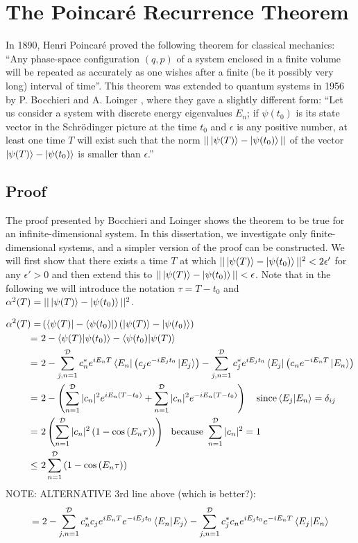 \documentclass[a4paper,10pt]{article}
\begin{document}
\section{The Poincar\'e Recurrence Theorem}

In 1890, Henri Poincar\'e proved the following theorem for classical mechanics: ``Any phase-space configuration $(q,p)$ of a system enclosed in a finite volume will be repeated as accurately as one wishes
after a finite (be it possibly very long) interval of time''. This theorem was extended to quantum systems in 1956 by P. Bocchieri and A. Loinger \cite{Bocchieri1957}, where they gave a slightly different
form: ``Let us consider a system with discrete energy eigenvalues $E_n$; if $\psi(t_0)$ is its state vector in the Schr{\"o}dinger picture at the time $t_0$ and $\epsilon$ is any positive number, at 
least one time $T$ will exist such that the norm $||\ket{\psi(T)}-\ket{\psi(t_0)}||$ of the vector $\ket{\psi(T)}-\ket{\psi(t_{0})}$ is smaller than $\epsilon$.''

\subsection{Proof}
The proof presented by Bocchieri and Loinger shows the theorem to be true for an infinite-dimensional system. In this dissertation, we investigate only finite-dimensional systems, and a simpler version of 
the proof can be constructed. We will first show that there exists a time $T$ at which $||\ket{\psi(T)}-\ket{\psi(t_0)}||^2<2\epsilon'$ for any $\epsilon'>0$ and then extend this to $||\ket{\psi(T)}-\ket{\psi(t_0)}||<\epsilon$. Note that in
the following we will introduce the notation $\tau=T-t_0$ and $\alpha^2(T)=||\ket{\psi(T)}-\ket{\psi(t_0)}||^2$.

\begin{align*}
 \alpha^2(T)=&\left(\bra {\psi(T)}-\bra {\psi(t_0)}\right)\left(\ket{\psi(T)}-\ket{\psi(t_0)}\right) \\
 = \ &2-\braket{\psi(T)|\psi(t_0)}-\braket{\psi(t_0)|\psi(T)} \\
 = \ &2-\sum_{j,n=1}^{\mathcal{D}}c_n^* e^{iE_{n}T}\bra{E_n}\left(c_je^{-iE_{j}t_{0}}\ket{E_j}\right)-\sum_{j,n=1}^{\mathcal{D}}c_j^*e^{iE_{j}t_{0}}\bra{E_j}\left(c_n e^{-iE_{n}T}\ket{E_n}\right) \\
 = \ &2-\left(\sum_{n=1}^\mathcal{D} |c_n|^2 e^{iE_{n}(T-t_0)}+\sum_{n=1}^\mathcal{D} |c_n|^2 e^{-iE_{n}(T-t_0)}\right) \ \ \ \text{since} \braket{E_j|E_n}=\delta_{ij} \\
 = \ &2\left(\sum_{n=1}^\mathcal{D} |c_n|^2\left(1-\cos\left(E_{n}\tau\right) \right) \right) \ \ \text{because}  \ \sum_{n=1}^\mathcal{D} |c_n|^2=1 \\
 \leq\ &2\sum_{n=1}^\mathcal{D}\left(1-\cos\left(E_{n}\tau\right) \right)
\end{align*}
NOTE: ALTERNATIVE 3rd line above (which is better?):
\begin{equation}
 = 2-\sum_{j,n=1}^{\mathcal{D}}c_n^* c_je^{iE_{n}T}e^{-iE_{j}t_{0}}\braket{E_n|E_j}-\sum_{j,n=1}^{\mathcal{D}}c_j^*c_ne^{iE_{j}t_{0}}e^{-iE_{n}T}\braket{E_j|E_n} 
\end{equation}
\end{document}
